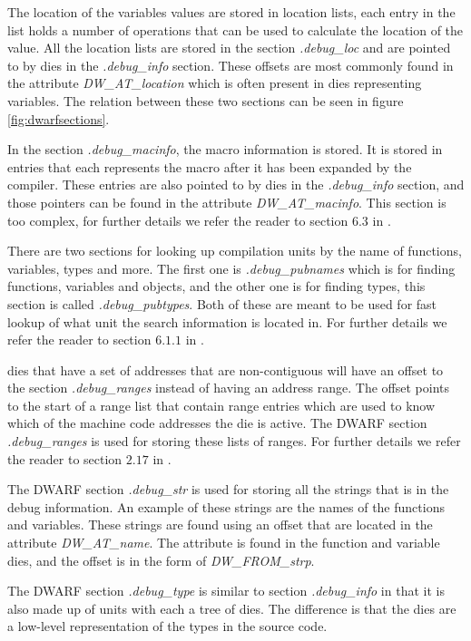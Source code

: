 The location of the variables values are stored in location lists, each entry in the list holds a number of operations that can be used to calculate the location of the value.
All the location lists are stored in the section \emph{.debug\_loc} and are pointed to by \glspl{die} in the \emph{.debug\_info} section.
These offsets are most commonly found in the attribute \emph{DW\_AT\_location} which is often present in \glspl{die} representing variables.
The relation between these two sections can be seen in figure \ref{fig:dwarfsections}.


In the section \emph{.debug\_macinfo}, the macro information is stored.
It is stored in entries that each represents the macro after it has been expanded by the compiler.
These entries are also pointed to by \glspl{die} in the \emph{.debug\_info} section, and those pointers can be found in the attribute \emph{DW\_AT\_macinfo}.
This section is too complex, for further details we refer the reader to section $6.3$ in \cite{dwarf}.


There are two sections for looking up compilation units by the name of functions, variables, types and more.
The first one is \emph{.debug\_pubnames} which is for finding functions, variables and objects, and the other one is for finding types, this section is called \emph{.debug\_pubtypes}.
Both of these are meant to be used for fast lookup of what unit the search information is located in.
For further details we refer the reader to section $6.1.1$ in \cite{dwarf}.


\Glspl{die} that have a set of addresses that are non-contiguous will have an offset to the section \emph{.debug\_ranges} instead of having an address range.
The offset points to the start of a range list that contain range entries which are used to know which of the machine code addresses the \gls{die} is active.
The \gls{DWARF} section \emph{.debug\_ranges} is used for storing these lists of ranges.
For further details we refer the reader to section $2.17$ in \cite{dwarf}.


The \gls{DWARF} section \emph{.debug\_str} is used for storing all the strings that is in the debug information.
An example of these strings are the names of the functions and variables.
These strings are found using an offset that are located in the attribute \emph{DW\_AT\_name}.
The attribute is found in the function and variable \glspl{die}, and the offset is in the form of \emph{DW\_FROM\_strp}.


The \gls{DWARF} section \emph{.debug\_type} is similar to section \emph{.debug\_info} in that it is also made up of units with each a tree of \glspl{die}.
The difference is that the \glspl{die} are a low-level representation of the types in the source code.

